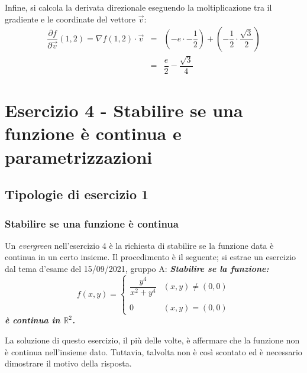 \documentclass[a4paper]{article}
\begin{document}
	Infine, si calcola la derivata direzionale eseguendo la moltiplicazione tra il gradiente e le coordinate del vettore $\overrightarrow{v}$:
	\begin{equation*}
		\begin{array}{lcl}
			\dfrac{\partial f}{\partial \overrightarrow{v}}\left(1,2\right) = \nabla f\left(1,2\right) \cdot \overrightarrow{v} &=& \left(-e \cdot -\dfrac{1}{2}\right) + \left(-\dfrac{1}{2} \cdot \dfrac{\sqrt{3}}{2}\right) \\ [1em]
			&=& \dfrac{e}{2} - \dfrac{\sqrt{3}}{4}
		\end{array}
	\end{equation*}\newpage

	\section{Esercizio 4 - Stabilire se una funzione è continua e parametrizzazioni}

	\subsection{Tipologie di esercizio 1}

	\subsubsection{Stabilire se una funzione è continua}

	Un \emph{evergreen} nell'esercizio 4 è la richiesta di stabilire se la funzione data è continua in un certo insieme. Il procedimento è il seguente; si estrae un esercizio dal tema d'esame del 15/09/2021, gruppo A: \textcolor{Green4}{\textbf{\emph{Stabilire se la funzione:}}
	\begin{equation*}
		f\left(x,y\right) = \begin{cases}
			\dfrac{y^{4}}{x^{2} + y^{4}} & \left(x,y\right) \ne \left(0,0\right) \\
			\\
			0	& \left(x,y\right) = \left(0,0\right)
		\end{cases}
	\end{equation*}
	\textbf{\emph{è continua in $\mathbb{R}^{2}$.}}}\newline

	\noindent
	La soluzione di questo esercizio, il più delle volte, è affermare che la funzione non è continua nell'insieme dato. Tuttavia, talvolta non è così scontato ed è necessario dimostrare il motivo della risposta.\newline
	
\end{document}
